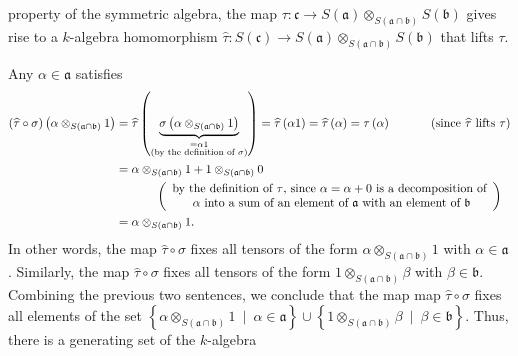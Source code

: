 \documentclass[etingof-lie.tex]{subfiles}
\begin{document}
{property of the symmetric algebra, the map $\tau:\mathfrak{c}\rightarrow
S\left(  \mathfrak{a}\right)  \otimes_{S\left(  \mathfrak{a}\cap
\mathfrak{b}\right)  }S\left(  \mathfrak{b}\right)  $ gives rise to a
$k$-algebra homomorphism $\widehat{\tau}:S\left(  \mathfrak{c}\right)
\rightarrow S\left(  \mathfrak{a}\right)  \otimes_{S\left(  \mathfrak{a}%
\cap\mathfrak{b}\right)  }S\left(  \mathfrak{b}\right)  $ that lifts $\tau$.
\par
Any $\alpha\in\mathfrak{a}$ satisfies%
\begin{align*}
\left(  \widehat{\tau}\circ\sigma\right)  \left(  \alpha\otimes_{S\left(
\mathfrak{a}\cap\mathfrak{b}\right)  }1\right)   &  =\widehat{\tau}\left(
\underbrace{\sigma\left(  \alpha\otimes_{S\left(  \mathfrak{a}\cap
\mathfrak{b}\right)  }1\right)  }_{\substack{=\alpha1\\\text{(by the
definition of }\sigma\text{)}}}\right)  =\widehat{\tau}\left(  \alpha1\right)
=\widehat{\tau}\left(  \alpha\right)  =\tau\left(  \alpha\right)
\ \ \ \ \ \ \ \ \ \ \left(  \text{since }\widehat{\tau}\text{ lifts }%
\tau\right) \\
&  =\alpha\otimes_{S\left(  \mathfrak{a}\cap\mathfrak{b}\right)  }%
1+1\otimes_{S\left(  \mathfrak{a}\cap\mathfrak{b}\right)  }0\\
&  \ \ \ \ \ \ \ \ \ \ \left(
\begin{array}
[c]{c}%
\text{by the definition of }\tau\text{, since }\alpha=\alpha+0\text{ is a
decomposition of}\\
\text{ }\alpha\text{ into a sum of an element of }\mathfrak{a}\text{ with an
element of }\mathfrak{b}%
\end{array}
\right) \\
&  =\alpha\otimes_{S\left(  \mathfrak{a}\cap\mathfrak{b}\right)  }1.
\end{align*}
In other words, the map $\widehat{\tau}\circ\sigma$ fixes all tensors of the
form $\alpha\otimes_{S\left(  \mathfrak{a}\cap\mathfrak{b}\right)  }1$ with
$\alpha\in\mathfrak{a}$. Similarly, the map $\widehat{\tau}\circ\sigma$ fixes
all tensors of the form $1\otimes_{S\left(  \mathfrak{a}\cap\mathfrak{b}%
\right)  }\beta$ with $\beta\in\mathfrak{b}$. Combining the previous two
sentences, we conclude that the map map $\widehat{\tau}\circ\sigma$ fixes all
elements of the set $\left\{  \alpha\otimes_{S\left(  \mathfrak{a}%
\cap\mathfrak{b}\right)  }1\ \mid\ \alpha\in\mathfrak{a}\right\}  \cup\left\{
1\otimes_{S\left(  \mathfrak{a}\cap\mathfrak{b}\right)  }\beta\ \mid\ \beta
\in\mathfrak{b}\right\}  $. Thus, there is a generating set of the $k$-algebra
}
\end{document}
